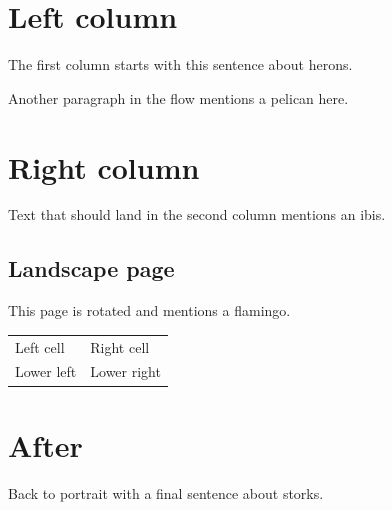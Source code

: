 \documentclass[twocolumn]{article}
\begin{document}
\section{Left column}
The first column starts with this sentence about herons.
\lipsum[1]

Another paragraph in the flow mentions a pelican here.
\lipsum[2-4]

\section{Right column}
Text that should land in the second column mentions an ibis.
\lipsum[5-6]

\begin{landscape}
\section{Landscape page}
This page is rotated and mentions a flamingo.
\begin{tabular}{ll}
  Left cell & Right cell \\
  Lower left & Lower right \\
\end{tabular}
\end{landscape}

\section{After}
Back to portrait with a final sentence about storks.
\end{document}
